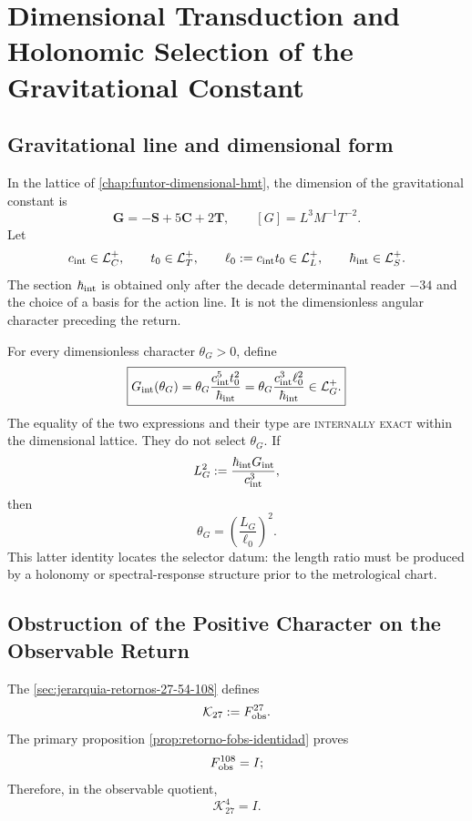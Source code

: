 
\chapter{Dimensional Transduction and Holonomic Selection of the Gravitational Constant}
\label{chap:transductor-gravitatorio-G}

\section{Gravitational line and dimensional form}
\label{sec:recta-gravitatoria-interna}

In the lattice of \cref{chap:funtor-dimensional-hmt}, the dimension of the
gravitational constant is
\[
 \mathbf G=-\mathbf S+5\mathbf C+2\mathbf T,
 \qquad
 [G]=L^3M^{-1}T^{-2}.
\]
Let
\[
 c_{\rm int}\in\mathcal L_C^+,\qquad
 t_0\in\mathcal L_T^+,\qquad
 \ell_0:=c_{\rm int}t_0\in\mathcal L_L^+,
 \qquad
 \hbar_{\rm int}\in\mathcal L_S^+.
\]
The section \(\hbar_{\rm int}\) is obtained only after the decade
determinantal reader \(-34\) and the choice of a basis for the action line.
It is not the dimensionless angular character preceding the return.

For every dimensionless character \(\theta_G>0\), define
\[
 \boxed{
 G_{\rm int}(\theta_G)
 =\theta_G
 \frac{c_{\rm int}^{5}t_0^2}{\hbar_{\rm int}}
 =\theta_G
 \frac{c_{\rm int}^{3}\ell_0^2}{\hbar_{\rm int}}
 \in\mathcal L_G^+.}
\]
The equality of the two expressions and their type are
\textsc{internally exact} within the dimensional lattice. They do not select
\(\theta_G\). If
\[
 L_G^2:=\frac{\hbar_{\rm int}G_{\rm int}}{c_{\rm int}^3},
\]
then
\[
 \theta_G=\left(\frac{L_G}{\ell_0}\right)^2.
\]
This latter identity locates the selector datum: the length ratio must
be produced by a holonomy or spectral-response structure
prior to the metrological chart.

\section{Obstruction of the Positive Character on the Observable Return}
\label{sec:selector-holonomia-G}

The \cref{sec:jerarquia-retornos-27-54-108} defines
\[
 \mathcal K_{27}:=F_{\rm obs}^{27}.
\]
The primary proposition \cref{prop:retorno-fobs-identidad} proves
\[
 F_{\rm obs}^{108}=I;
\]
Therefore, in the observable quotient,
\[
 \mathcal K_{27}^{4}=I.
\]

